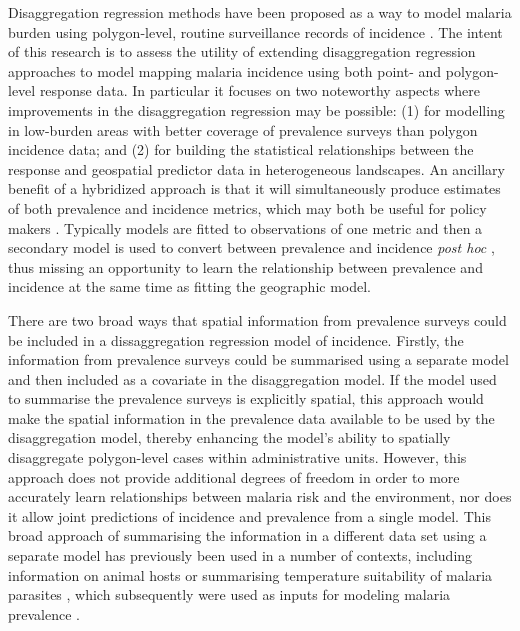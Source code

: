 \documentclass{statsoc}
\begin{document}
Disaggregation regression methods have been proposed as a way to model malaria burden using polygon-level, routine surveillance records of incidence \citep{sturrock2014fine, wilson2017pointless, law2018variational, taylor2017continuous, li2012log}.
The intent of this research is to assess the utility of extending disaggregation regression approaches to model mapping malaria incidence using both point- and polygon-level response data. 
In particular it focuses on two noteworthy aspects where improvements in  the disaggregation regression may be possible:
(1) for modelling in low-burden areas with better coverage of prevalence surveys than polygon incidence data; and
(2) for building the statistical relationships between the response and geospatial predictor data in heterogeneous landscapes. An ancillary benefit of a hybridized approach is that it will simultaneously produce estimates of both prevalence and incidence metrics, which may both be useful for policy makers \citep{cohen2017mapping}.
Typically models are fitted to observations of one metric and then a secondary model is used to convert between prevalence and incidence \emph{post hoc} \citep{battle2019mapping, bhatt2015effect}, thus missing an opportunity to learn the relationship between prevalence and incidence at the same time as fitting the geographic model. 

There are two broad ways that spatial information from prevalence surveys could be included in a dissaggregation regression model of incidence.
Firstly, the information from prevalence surveys could be summarised using a separate model and then included as a covariate in the disaggregation model.
If the model used to summarise the prevalence surveys is explicitly spatial, this approach would make the spatial information in the prevalence data available to be used by the disaggregation model, thereby enhancing the model’s ability to spatially disaggregate polygon-level cases within administrative units.
However, this approach does not provide additional degrees of freedom in order to more accurately learn relationships between malaria risk and the environment, nor does it allow joint predictions of incidence and prevalence from a single model.
This broad approach of summarising the information in a different data set using a separate model has previously been used in a number of contexts, including information on animal hosts \citep{shearer2016estimating} or summarising temperature suitability of malaria parasites \citep{weiss2014air}, which subsequently were used as inputs for modeling malaria prevalence \citep{bhatt2015effect, weiss2019mapping}.
\end{document}

